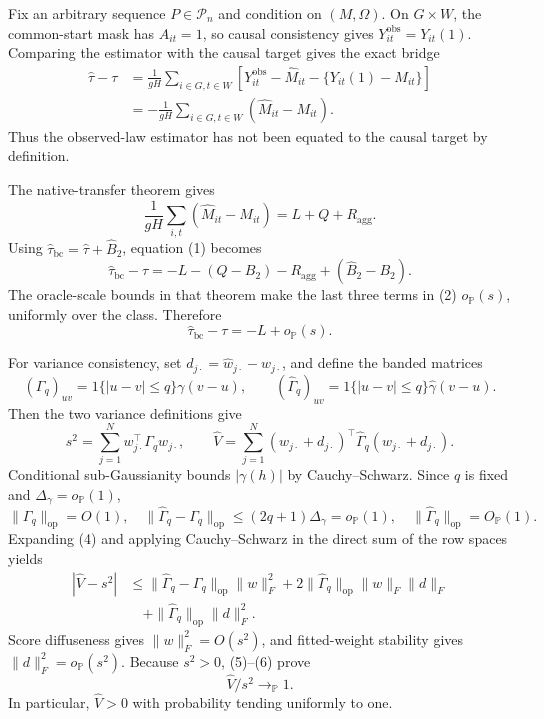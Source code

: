 Fix an arbitrary sequence \(P\in\mathcal P_n\) and condition on \((M,\Omega)\).  On \(G\times W\), the common-start mask has \(A_{it}=1\), so causal consistency gives \(Y^{\mathrm{obs}}_{it}=Y_{it}(1)\).  Comparing the estimator with the causal target gives the exact bridge
\[
 \begin{aligned}
 \widehat\tau-\tau
 &=\frac1{gH}\sum_{i\in G,t\in W}
 \left[Y^{\mathrm{obs}}_{it}-\widehat M_{it}
 -\{Y_{it}(1)-M_{it}\}\right]\\
 &=-\frac1{gH}\sum_{i\in G,t\in W}(\widehat M_{it}-M_{it}).
 \end{aligned}
 \tag{1}
\]
Thus the observed-law estimator has not been equated to the causal target by definition.

The native-transfer theorem gives
\[
 \frac1{gH}\sum_{i,t}(\widehat M_{it}-M_{it})=L+Q+R_{\mathrm{agg}}.
\]
Using \(\widehat\tau_{\mathrm{bc}}=\widehat\tau+\widehat B_2\), equation (1) becomes
\[
 \widehat\tau_{\mathrm{bc}}-\tau
 =-L-(Q-B_2)-R_{\mathrm{agg}}+(\widehat B_2-B_2).
 \tag{2}
\]
The oracle-scale bounds in that theorem make the last three terms in (2) \(o_{\mathbb P}(s)\), uniformly over the class.  Therefore
\[
 \widehat\tau_{\mathrm{bc}}-\tau=-L+o_{\mathbb P}(s).
 \tag{3}
\]

For variance consistency, set \(d_{j\cdot}=\widehat w_{j\cdot}-w_{j\cdot}\), and define the banded matrices
\[
 (\Gamma_q)_{uv}=1\{|u-v|\le q\}\gamma(v-u),
 \qquad
 (\widehat\Gamma_q)_{uv}=1\{|u-v|\le q\}\widehat\gamma(v-u).
\]
Then the two variance definitions give
\[
 s^2=\sum_{j=1}^Nw_{j\cdot}^{\top}\Gamma_qw_{j\cdot},
 \qquad
 \widehat V=\sum_{j=1}^N(w_{j\cdot}+d_{j\cdot})^{\top}
 \widehat\Gamma_q(w_{j\cdot}+d_{j\cdot}).
 \tag{4}
\]
Conditional sub-Gaussianity bounds \(|\gamma(h)|\) by Cauchy--Schwarz.  Since \(q\) is fixed and \(\Delta_\gamma=o_{\mathbb P}(1)\),
\[
 \|\Gamma_q\|_{\mathrm{op}}=O(1),
 \quad
 \|\widehat\Gamma_q-\Gamma_q\|_{\mathrm{op}}
 \le(2q+1)\Delta_\gamma=o_{\mathbb P}(1),
 \quad
 \|\widehat\Gamma_q\|_{\mathrm{op}}=O_{\mathbb P}(1).
 \tag{5}
\]
Expanding (4) and applying Cauchy--Schwarz in the direct sum of the row spaces yields
\[
 \begin{aligned}
 |\widehat V-s^2|
 &\le\|\widehat\Gamma_q-\Gamma_q\|_{\mathrm{op}}\|w\|_F^2
 +2\|\widehat\Gamma_q\|_{\mathrm{op}}\|w\|_F\|d\|_F\\
 &\quad+\|\widehat\Gamma_q\|_{\mathrm{op}}\|d\|_F^2.
 \end{aligned}
 \tag{6}
\]
Score diffuseness gives \(\|w\|_F^2=O(s^2)\), and fitted-weight stability gives \(\|d\|_F^2=o_{\mathbb P}(s^2)\).  Because \(s^2>0\), (5)--(6) prove
\[
 \widehat V/s^2\to_{\mathbb P}1.
 \tag{7}
\]
In particular, \(\widehat V>0\) with probability tending uniformly to one.

